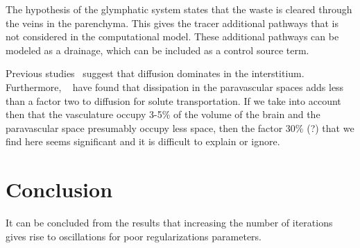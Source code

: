 \documentclass[11pt,a4paper]{article}
\begin{document}
The hypothesis of the glymphatic system \cite{iliff2012paravascular} states that the waste is cleared through the veins in the parenchyma. This gives the tracer additional pathways that is not considered in the computational model. These additional pathways can be modeled as a drainage, which can be included as a control source term. 

Previous studies~\cite{holter2017interstitial, smith2017glymphatic} suggest that diffusion dominates in the interstitium. Furthermore, 
~\cite{asgari2016glymphatic, brynjfm, diem?} have found that dissipation in the paravascular spaces adds less than a factor two
to diffusion for solute transportation. If we take into account then that the vasculature occupy 3-5\% of the volume
of the brain and the paravascular space presumably occupy less space, then the factor 30\% (?) that we find here 
seems significant and it is difficult to explain or ignore.      



 
\section{Conclusion}

It can be concluded from the results that increasing the number of iterations gives rise to oscillations for poor regularizations parameters. 


%
%
% 
% 
% 
%
% 
\end{document}
